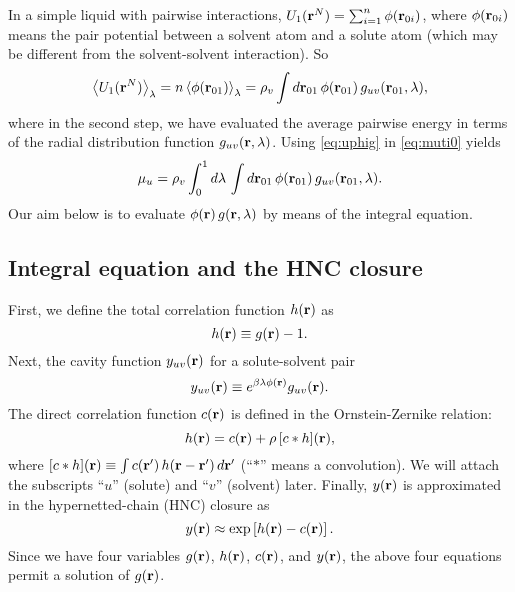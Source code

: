 \documentclass[12pt]{article}
\begin{document}
In a simple liquid with pairwise interactions,
  $U_1(\mathbf{r}^N) = \sum_{i = 1}^{n} \phi(\mathbf{r}_{0i})$,
  where $\phi(\mathbf{r}_{0i})$ means the pair potential
  between a solvent atom and a solute atom
  (which may be different from the solvent-solvent
  interaction).
So
\begin{equation}
    \left\langle
      U_1(\mathbf{r}^N)
    \right\rangle_\lambda
    =
    n
    \left\langle
      \phi(\mathbf{r}_{01})
    \right\rangle_\lambda
    =
    \rho_v \int d\mathbf{r}_{01} \,
      \phi(\mathbf{r}_{01}) \, g_{uv}(\mathbf{r}_{01}, \lambda),
  \label{eq:uphig}
\end{equation}
%
where in the second step, we have evaluated the average
pairwise energy in terms of the radial distribution function
$g_{uv}(\mathbf{r}, \lambda)$.
Using \eqref{eq:uphig} in \eqref{eq:muti0} yields
\begin{equation}
    \mu_u
    =
    \rho_v
    \int_0^1 d\lambda \,
      \int d\mathbf{r}_{01} \,
        \phi(\mathbf{r}_{01}) \, g_{uv}(\mathbf{r}_{01}, \lambda).
  \label{eq:muti}
\end{equation}
Our aim below is to evaluate
$\phi(\mathbf{r}) \, g(\mathbf{r}, \lambda)$
by means of the integral equation.



\subsection{\label{sec:funcs}Integral equation and the HNC closure}

First, we define the total correlation function $h(\mathbf{r})$ as
\begin{equation}
  h(\mathbf{r}) \equiv g(\mathbf{r}) - 1.
  \label{eq:hr}
\end{equation}
%
%
%
Next, the cavity function $y_{uv}(\mathbf{r})$ for a solute-solvent pair
\begin{equation}
  y_{uv}(\mathbf{r}) \equiv e^{ \beta \lambda \phi(\mathbf{r}) } g_{uv}(\mathbf{r}).
  \label{eq:yr}
\end{equation}
%
%
%
The direct correlation function $c(\mathbf{r})$
is defined in the Ornstein-Zernike relation:
\begin{equation}
  h(\mathbf{r}) = c(\mathbf{r}) + \rho \, [c * h](\mathbf{r}),
  \label{eq:oz}
\end{equation}
where $[c*h](\mathbf{r}) \equiv \int c(\mathbf{r}') \, h(\mathbf{r} - \mathbf{r}') \, d\mathbf{r}'$
  (``$*$'' means a convolution).
We will attach the subscripts ``$u$'' (solute) and ``$v$'' (solvent) later.
%
%
%
%
%
%
Finally, $y(\mathbf{r})$ is approximated in the hypernetted-chain (HNC) closure as
\begin{equation}
  y(\mathbf{r}) \approx \exp\left[ h(\mathbf{r}) - c(\mathbf{r}) \right].
  \label{eq:hnc}
\end{equation}
Since we have four variables
  $g(\mathbf{r})$, $h(\mathbf{r})$, $c(\mathbf{r})$, and $y(\mathbf{r})$,
the above four equations permit a solution of $g(\mathbf{r})$.
\end{document}
